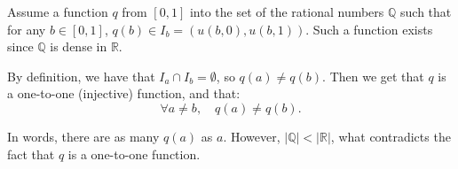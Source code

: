 \documentclass[11pt]{article} %
\begin{document}
Assume a function $q$ from $[0, 1] $ into the set of the rational numbers $ \mathbb{Q} $ such that for any $b \in [0,1]$, $q(b)  \in  I_b = (u(b, 0), u(b, 1))$. Such a function exists since $ \mathbb{Q}$ is dense in  $\mathbb{R}$. 

By definition, we have that $ I_a \cap I_b = \emptyset$, so $q(a) \neq q(b) $. Then we get that $ q$ is a one-to-one (injective) function, and that: $$\forall a \neq b, \quad q(a) \neq q(b). $$

In words, there are as many $q(a) $ as $ a$. However, $\vert \mathbb{Q} \vert < \vert \mathbb{R} \vert $, what contradicts the fact that $q$ is a one-to-one function.\\




 
\end{document}
